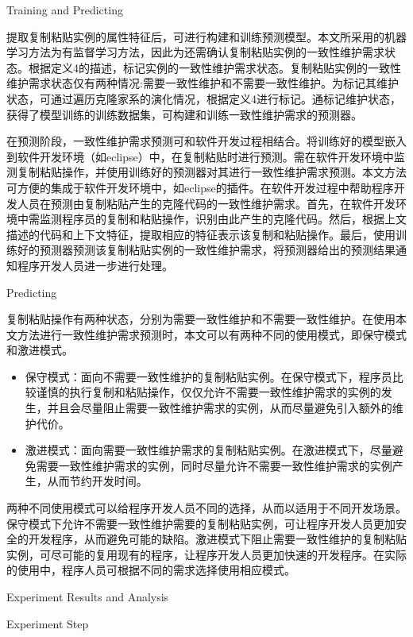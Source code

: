 {Training and Predicting}

提取复制粘贴实例的属性特征后，可进行构建和训练预测模型。本文所采用的机器学习方法为有监督学习方法，因此为还需确认复制粘贴实例的一致性维护需求状态。根据定义4的描述，标记实例的一致性维护需求状态。复制粘贴实例的一致性维护需求状态仅有两种情况:需要一致性维护和不需要一致性维护。为标记其维护状态，可通过遍历克隆家系的演化情况，根据定义4进行标记。通标记维护状态，获得了模型训练的训练数据集，可构建和训练一致性维护需求的预测器。


在预测阶段，一致性维护需求预测可和软件开发过程相结合。将训练好的模型嵌入到软件开发环境（如eclipse）中，在复制粘贴时进行预测。需在软件开发环境中监测复制粘贴操作，并使用训练好的预测器对其进行一致性维护需求预测。本文方法可方便的集成于软件开发环境中，如eclipse的插件。在软件开发过程中帮助程序开发人员在预测由复制粘贴产生的克隆代码的一致性维护需求。首先，在软件开发环境中需监测程序员的复制和粘贴操作，识别由此产生的克隆代码。然后，根据上文描述的代码和上下文特征，提取相应的特征表示该复制和粘贴操作。最后，使用训练好的预测器预测该复制粘贴实例的一致性维护需求，将预测器给出的预测结果通知程序开发人员进一步进行处理。

{Predicting}

复制粘贴操作有两种状态，分别为需要一致性维护和不需要一致性维护。在使用本文方法进行一致性维护需求预测时，本文可以有两种不同的使用模式，即保守模式和激进模式。

\begin{itemize}
\item 
保守模式：面向不需要一致性维护的复制粘贴实例。在保守模式下，程序员比较谨慎的执行复制和粘贴操作，仅仅允许不需要一致性维护需求的实例的发生，并且会尽量阻止需要一致性维护需求的实例，从而尽量避免引入额外的维护代价。
\item
激进模式：面向需要一致性维护需求的复制粘贴实例。在激进模式下，尽量避免需要一致性维护需求的实例，同时尽量允许不需要一致性维护需求的实例产生，从而节约开发时间。
\end{itemize}

两种不同使用模式可以给程序开发人员不同的选择，从而以适用于不同开发场景。保守模式下允许不需要一致性维护需要的复制粘贴实例，可让程序开发人员更加安全的开发程序，从而避免可能的缺陷。激进模式下阻止需要一致性维护的复制粘贴实例，可尽可能的复用现有的程序，让程序开发人员更加快速的开发程序。在实际的使用中，程序人员可根据不同的需求选择使用相应模式。

{Experiment Results and Analysis}

{Experiment Step}

